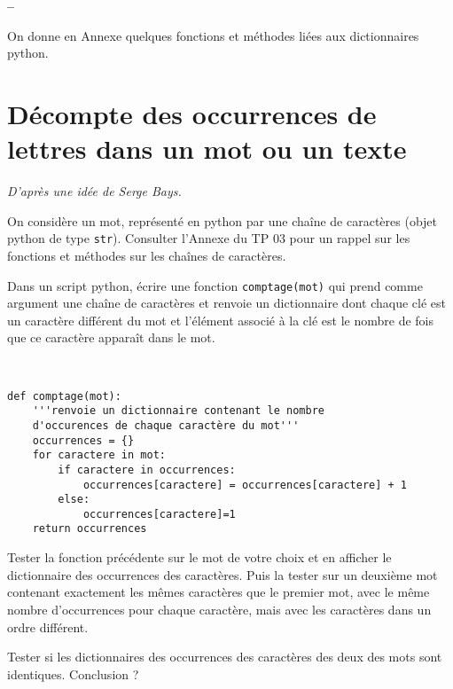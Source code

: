 

%




\begin{center}
{\Large\bf {\type} \no {\numero} -- \descrip}
\end{center}


On donne en Annexe quelques fonctions et méthodes liées aux dictionnaires python.

\section{Décompte des occurrences de lettres dans un mot ou un texte}
\vspace{-\baselineskip}
\begin{footnotesize}\textit{D'après une idée de Serge Bays.}\end{footnotesize}
\vspace{\baselineskip}

\begin{exercice}
On considère un mot, représenté en python par une chaîne de caractères (objet python de type \texttt{str}). Consulter l'Annexe du TP 03 pour un rappel sur les fonctions et méthodes sur les chaînes de caractères.

Dans un script python, écrire une fonction \texttt{comptage(mot)} qui prend comme argument une chaîne de caractères et renvoie un dictionnaire dont chaque clé est un caractère différent du mot et l'élément associé à la clé est le nombre de fois que ce caractère apparaît dans le mot.
\end{exercice}

\begin{solution}~\
\begin{verbatim}
def comptage(mot):
    '''renvoie un dictionnaire contenant le nombre
    d'occurences de chaque caractère du mot'''
    occurrences = {}
    for caractere in mot:
        if caractere in occurrences:
            occurrences[caractere] = occurrences[caractere] + 1
        else:
            occurrences[caractere]=1
    return occurrences
\end{verbatim}
\end{solution}

\begin{exercice}
Tester la fonction précédente sur le mot de votre choix et en afficher le dictionnaire des occurrences des caractères. Puis la tester sur un deuxième mot contenant exactement les mêmes caractères que le premier mot, avec le même nombre d'occurrences pour chaque caractère, mais avec les caractères dans un ordre différent.

Tester si les dictionnaires des occurrences des caractères des deux des mots sont identiques. Conclusion ?
\end{exercice}

